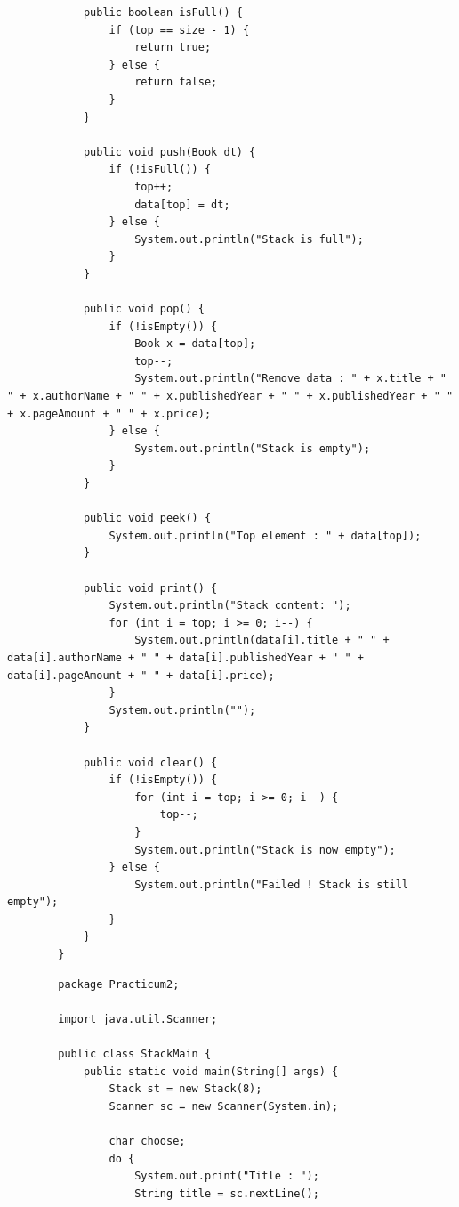 \documentclass[12pt,titlepage]{article}
\begin{document}
\begin{enumerate}
\begin{verbatim}
            public boolean isFull() {
                if (top == size - 1) {
                    return true;
                } else {
                    return false;
                }
            }

            public void push(Book dt) {
                if (!isFull()) {
                    top++;
                    data[top] = dt;
                } else {
                    System.out.println("Stack is full");
                }
            }

            public void pop() {
                if (!isEmpty()) {
                    Book x = data[top];
                    top--;
                    System.out.println("Remove data : " + x.title + " " + x.authorName + " " + x.publishedYear + " " + x.publishedYear + " " + x.pageAmount + " " + x.price);
                } else {
                    System.out.println("Stack is empty");
                }
            }

            public void peek() {
                System.out.println("Top element : " + data[top]);
            }

            public void print() {
                System.out.println("Stack content: ");
                for (int i = top; i >= 0; i--) {
                    System.out.println(data[i].title + " " + data[i].authorName + " " + data[i].publishedYear + " " + data[i].pageAmount + " " + data[i].price);
                }
                System.out.println("");
            }

            public void clear() {
                if (!isEmpty()) {
                    for (int i = top; i >= 0; i--) {
                        top--;
                    }
                    System.out.println("Stack is now empty");
                } else {
                    System.out.println("Failed ! Stack is still empty");
                }
            }
        }
    \end{verbatim}
    \begin{verbatim}
        package Practicum2;

        import java.util.Scanner;

        public class StackMain {
            public static void main(String[] args) {
                Stack st = new Stack(8);
                Scanner sc = new Scanner(System.in);

                char choose;
                do {
                    System.out.print("Title : ");
                    String title = sc.nextLine();
                    

\end{verbatim}
\end{enumerate}
\end{document}
